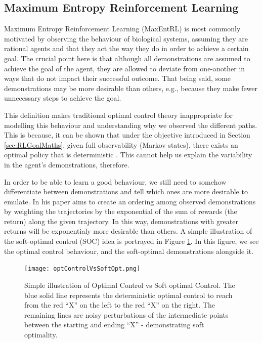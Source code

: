 \documentclass{report}
\numberwithin{equation}{section}
\numberwithin{figure}{section}
\numberwithin{table}{section}
\numberwithin{algorithm}{section}
\begin{document}
\subsection{Maximum Entropy Reinforcement Learning}\label{sec:MaxEntRL}
Maximum Entropy Reinforcement Learning (MaxEntRL) is most commonly 
motivated by observing the behaviour of biological systems, assuming 
they are rational agents and that they act the way they do in order to achieve 
a certain goal. The crucial point here is that although all 
demonstrations are assumed to achieve the goal of the agent, 
they are allowed to deviate from one-another in ways that 
do not impact their successful outcome. That being said, 
some demonstrations may be more desirable than others, e.g., 
because they make fewer unnecessary steps to achieve the goal.

This definition makes 
traditional optimal control theory inappropriate for modelling 
this behaviour and understanding why we observed the different 
paths. This is because, it can be shown that under the objective 
introduced in Section \ref{sec:RLGoalMaths}, given full observability 
(Markov states), there exists an optimal policy that 
is deterministic \citep{Sutton1998}.
This cannot help us explain the variability in the agent's demonstrations,
therefore.

In order to be able to learn a good behaviour, we still 
need to somehow differentiate between demonstrations and tell 
which ones are more desirable to emulate. 
In his paper \cite{Ziebart2008} aims to create an ordering among 
observed demonstrations by weighting the trajectories 
by the exponential of the sum of rewards (the return) along 
the given trajectory. In this way, demonstrations with greater 
returns 
will be exponentialy more desirable than others. A simple illustration 
of the soft-optimal control (SOC) idea is portrayed in Figure \ref{fig:softopt}. 
In this figure, we see the optimal control behaviour, and the 
soft-optimal demonstrations alongside it.


\begin{figure}[H]
  \begin{center}
    \texttt{[image: optControlVsSoftOpt.png]}
  \end{center}
  \caption{\label{fig:softopt}Simple illustration of Optimal Control vs Soft optimal 
  Control. The blue solid line represents the deterministic optimal 
  control to reach from the red ``X'' on the left to the 
  red ``X'' on the right. The remaining lines 
  are noisy perturbations of the intermediate points 
  between the starting and ending ``X'' - demonstrating 
  soft optimality.}
\end{figure}
\end{document}
